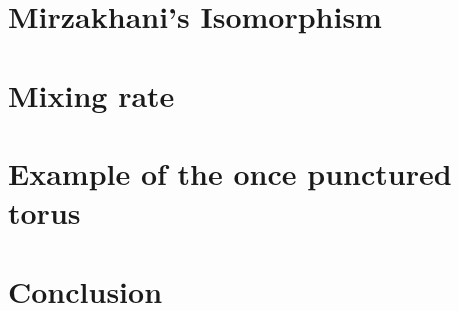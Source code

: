 \documentclass[12pt]{article}
\theoremstyle{plain}%
\theoremstyle{definition}
\theoremstyle{remark}
\begin{document}
\section{Mirzakhani's Isomorphism}

\newpage

\section{Mixing rate}

\newpage

\section{Example of the once punctured torus}

\newpage

\section{Conclusion}

\newpage



\end{document}
